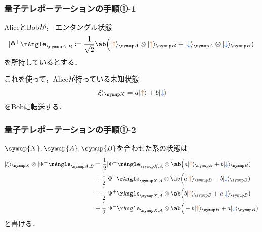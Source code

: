 \documentclass[
    10pt,
    ]{sotsu-beamer}
\newcommand{\bitone}{\mathcolor{fire}{\uparrow}}
\newcommand{\bittwo}{\mathcolor{water}{\downarrow}}
\begin{document}
\begin{frame}
    \frametitle{量子テレポーテーションの手順①-1}

    AliceとBobが，
    エンタングル状態
    \begin{equation*}
        \Ket{\Phi^+}<A,B> 
        \coloneq \frac{1}{\sqrt{2}}
        \ab\Big( \ket{\bitone}<A> \otimes \ket{\bitone}<B> + \ket{\bittwo}<A> \otimes \ket{\bittwo}<B> )
    \end{equation*}
    を所持しているとする．

    これを使って，Aliceが持っている未知状態
    \begin{equation*}
        \ket{\xi}<X> = a \ket{\bitone} + b \ket{\bittwo}
    \end{equation*}
    をBobに転送する．

\end{frame}


\begin{frame}
    \frametitle{量子テレポーテーションの手順①-2}

    $\symup{X}, \symup{A}, \symup{B}$を合わせた系の状態は
    \begin{equation}
        \label{eq:system-XAB}
        \begin{split}
            \ket{\xi}<X> \otimes \Ket{\Phi^+}<A,B>
            &= \frac{1}{2} \Ket{\Phi^+}<X,A> \otimes 
                \ab\Big( a \ket{\bitone}<B> + b \ket{\bittwo}<B> )
                \\
            &+ \frac{1}{2} \Ket{\Phi^-}<X,A> \otimes 
                \ab\Big( a \ket{\bitone}<B> - b \ket{\bittwo}<B> )
                \\
            &+ \frac{1}{2} \Ket{\Psi^+}<X,A> \otimes 
                \ab\Big( b \ket{\bitone}<B> + a \ket{\bittwo}<B> )
            \\
            &+ \frac{1}{2} \Ket{\Psi^-}<X,A> \otimes 
                \ab\Big(-b \ket{\bitone}<B> + a \ket{\bittwo}<B> )
        \end{split}
    \end{equation}
    と書ける．

\end{frame}
\end{document}
